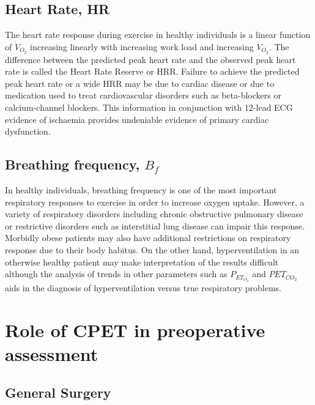 \subsection{Heart Rate, HR}
\label{sec:heart_rate}
The heart rate response during exercise in healthy individuals is a linear function of $\dot{V}_{O_2}$ increasing linearly with increasing work load and increasing $\dot{V}_{O_2}$. The difference between the predicted peak heart rate and the observed peak heart rate is called the Heart Rate Reserve or HRR. Failure to achieve the predicted peak heart rate or a wide HRR may be due to cardiac disease or due to medication used to treat cardiovascular disorders such as beta-blockers or calcium-channel blockers. This information in conjunction with 12-lead ECG evidence of ischaemia provides undeniable evidence of primary cardiac dysfunction.

\subsection{Breathing frequency, $B_f$}
In healthy individuals, breathing frequency is one of the most important respiratory responses to exercise in order to increase oxygen uptake. However, a variety of respiratory disorders including chronic obstructive pulmonary disease or restrictive disorders such as interstitial lung disease can impair this response. Morbidly obese patients may also have additional restrictions on respiratory response due to their body habitus. On the other hand, hyperventilation in an otherwise healthy patient may make interpretation of the results difficult although the analysis of trends in other parameters such as $P_{ET_{O_2}}$ and $P{ET_{CO_2}}$ aids in the diagnosis of hyperventilation versus true respiratory problems.

\section{Role of CPET in preoperative assessment}
\label{sec:cpx_roleInAssessment}
\subsection{General Surgery}

